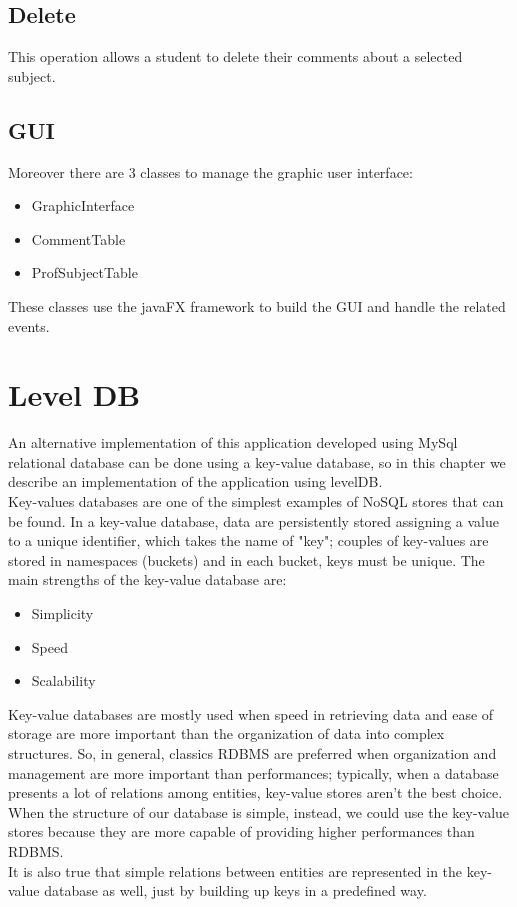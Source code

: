 \documentclass[a4paper, oneside]{article}
\begin{document}
\subsection{Delete}
This operation allows a student to delete their comments about a selected subject.\\
\vspace{2mm}

\vspace{5mm}

\subsection{GUI}
Moreover there are 3 classes to manage the graphic user interface: 
\begin{itemize}
\item GraphicInterface
\item CommentTable
\item ProfSubjectTable
\end{itemize}
 These classes use the javaFX framework to build the GUI and handle the related events.

\clearpage


\section{Level DB}

An alternative implementation of this application developed using MySql relational database can be done using a key-value database, so in this chapter we describe an implementation of the application using levelDB.\\
Key-values databases are one of the simplest examples of NoSQL stores that can be found. In a key-value database, data are persistently stored assigning a value to a unique identifier, which takes the name of "key"; couples of key-values are stored in namespaces (buckets) and in each bucket, keys must be unique. The main strengths of the key-value database are:
\begin{itemize}
\item Simplicity
\item Speed 
\item Scalability
\end{itemize}
Key-value databases are mostly used when speed in retrieving data and ease of storage are more important than the organization of data into complex structures. So, in general, classics RDBMS are preferred when organization and management are more important than performances; typically, when a database presents a lot of relations among entities, key-value stores aren’t the best choice. When the structure of our database is simple, instead, we could use the key-value stores because they are more capable of providing higher performances than RDBMS.\\
It is also true that simple relations between entities are represented in the key-value database as well, just by building up keys in a predefined way.
\end{document}
